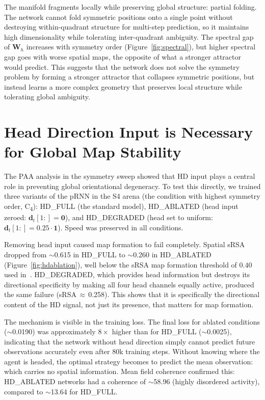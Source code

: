 ﻿\documentclass[11pt, a4paper]{article}
\begin{document}
\noindent The manifold fragments locally while preserving global structure: partial folding. The network cannot fold symmetric positions onto a single point without destroying within-quadrant structure for multi-step prediction, so it maintains high dimensionality while tolerating inter-quadrant ambiguity. The spectral gap of $\mathbf{W}_h$ increases with symmetry order (Figure~\ref{fig:spectral}), but higher spectral gap goes with worse spatial maps, the opposite of what a stronger attractor would predict. This suggests that the network does not solve the symmetry problem by forming a stronger attractor that collapses symmetric positions, but instead learns a more complex geometry that preserves local structure while tolerating global ambiguity.

\section*{Head Direction Input is Necessary for Global Map Stability}
\label{sec:hdablation}

The PAA analysis in the symmetry sweep showed that HD input plays a
central role in preventing global orientational degeneracy. To test this
directly, we trained three variants of the pRNN in the S4 arena (the
condition with highest symmetry order, C\textsubscript{4}): HD\_FULL (the standard model), HD\_ABLATED (head
input zeroed: $\mathbf{d}_t[1{:}] = \mathbf{0}$), and HD\_DEGRADED (head set to
uniform: $\mathbf{d}_t[1{:}] = 0.25\cdot\mathbf{1}$). Speed was preserved in all
conditions.

Removing head input caused map formation to fail completely. Spatial
sRSA dropped from $\sim$0.615 in HD\_FULL to
$\sim$0.260 in HD\_ABLATED (Figure~\ref{fig:hdablation}),
well below the sRSA map formation threshold of $0.40$ used in~\citet{levenstein2024}. HD\_DEGRADED, which provides
head information but destroys its directional specificity by making all
four head channels equally active, produced the same failure
(sRSA\,$\approx$\,0.258). This shows that it is
specifically the directional content of the HD signal, not just its
presence, that matters for map formation.

The mechanism is visible in the training loss. The final loss for ablated
conditions ($\sim$0.0190) was approximately $8\times$ higher than
for HD\_FULL ($\sim$0.0025), indicating that the network
without head direction simply cannot predict future observations
accurately even after 80k training steps. Without knowing where the agent
is headed, the optimal strategy becomes to predict the mean observation:
which carries no spatial information. Mean field coherence confirmed this:
HD\_ABLATED networks had a coherence of $\sim$58.96
(highly disordered activity), compared to $\sim$13.64 for
HD\_FULL.
\end{document}
